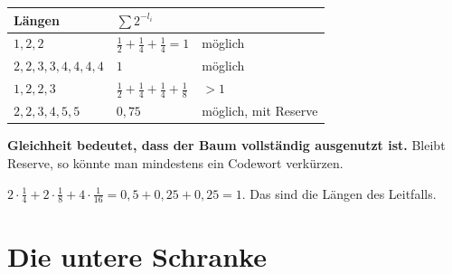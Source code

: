 \begin{merksatz}
\begin{center}
{\small
\renewcommand{\arraystretch}{1.48}
\begin{tabular}{@{}P{2.8cm}P{2.6cm}P{2.4cm}@{}}
\toprule
\textbf{Längen} & $\sum 2^{-l_i}$ & \\
\midrule
$1,2,2$ & $\tfrac12+\tfrac14+\tfrac14 = 1$ & \textcolor{gruen}{möglich}\\
$2,2,3,3,4,4,4,4$ & $1$ & \textcolor{gruen}{möglich}\\
$1,2,2,3$ & $\tfrac12+\tfrac14+\tfrac14+\tfrac18$ & \textcolor{akzent}{$>1$}\\
$2,2,3,4,5,5$ & $0{,}75$ & \textcolor{gruen}{möglich, mit Reserve}\\
\bottomrule
\end{tabular}}
\end{center}

\begin{center}
\begin{minipage}{0.9\textwidth}
\textbf{Gleichheit bedeutet, dass der Baum vollständig ausgenutzt ist.} Bleibt Reserve, so könnte man mindestens ein Codewort verkürzen.
\end{minipage}
\end{center}

 $2\cdot\frac14 + 2\cdot\frac18 + 4\cdot\frac1{16} = 0{,}5+0{,}25+0{,}25 = 1$. Das sind die Längen des Leitfalls.
\end{merksatz}

\section{Die untere Schranke}


